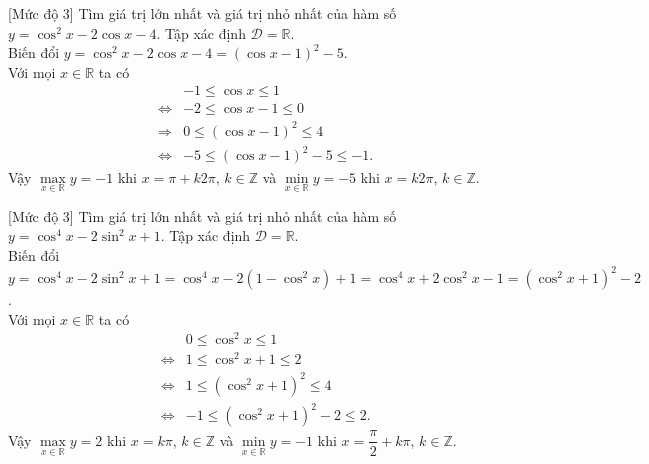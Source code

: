\begin{bt}%
	[Mức độ 3]
	Tìm giá trị lớn nhất và giá trị nhỏ nhất của hàm số  $y=\cos^2 x-2 \cos x-4$.
	\loigiai
	{
		Tập xác định $\mathscr{D}=\mathbb{R}$.\\
		Biến đổi $y=\cos^2 x-2 \cos x-4=\left(\cos x-1\right)^2-5$.\\
		Với mọi $x\in \mathbb{R}$ ta có
		\allowdisplaybreaks
		\begin{eqnarray*}
			& & -1\leq \cos x\leq 1\\
			&\Leftrightarrow& -2\leq \cos x-1\leq 0\\
			&\Rightarrow&0\leq \left( \cos x-1\right)^2\leq 4\\
			&\Leftrightarrow&-5\leq \left( \cos x-1\right)^2-5\leq -1.
		\end{eqnarray*}
		Vậy $\max\limits_{x \in \mathbb{R}} y=-1$ khi $x=\pi+k2\pi$, $k\in \mathbb{Z}$ và $\min\limits_{x \in \mathbb{R}} y=-5$ khi $x=k2\pi$, $k\in \mathbb{Z}$.
	}
\end{bt}

\begin{bt}%
	[Mức độ 3]
	Tìm giá trị lớn nhất và giá trị nhỏ nhất của hàm số $y=\cos^4 x-2 \sin^2 x+1$.
	\loigiai
	{
		Tập xác định $\mathscr{D}=\mathbb{R}$.\\
		Biến đổi $y=\cos^4 x-2 \sin^2 x+1=\cos^4 x-2 \left(1-\cos^2 x\right)+1=\cos^4 x+2 \cos^2 x-1=\left(\cos^2 x+1\right)^2-2 $.\\
		Với mọi $x\in \mathbb{R}$ ta có
		\allowdisplaybreaks
		\begin{eqnarray*}
			& & 0\leq \cos^2 x\leq 1\\
			&\Leftrightarrow& 1\leq \cos^2 x+1\leq 2\\
			&\Leftrightarrow&1\leq \left( \cos^2 x+1\right)^2\leq 4\\
			&\Leftrightarrow&-1\leq \left( \cos^2 x+1\right)^2-2\leq 2.
		\end{eqnarray*}
		Vậy $\max\limits_{x \in \mathbb{R}} y=2$ khi $x=k\pi$, $k\in \mathbb{Z}$ và $\min\limits_{x \in \mathbb{R}} y=-1$ khi $x=\dfrac{\pi}{2}+k\pi$, $k\in \mathbb{Z}$.
	}
\end{bt}

